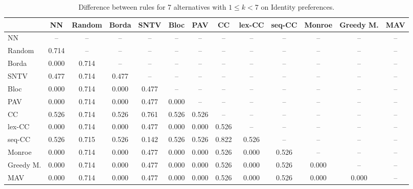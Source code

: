 
\begin{table*}[htbp]
\centering
\begin{tabular}{lcccccccccccc}
\toprule
 & NN & Random & Borda & SNTV & Bloc & PAV & CC & lex-CC & seq-CC & Monroe & Greedy M. & MAV \\
\midrule
NN & -- & -- & -- & -- & -- & -- & -- & -- & -- & -- & -- & -- \\
Random & \cellcolor{blue!71} 0.714 & -- & -- & -- & -- & -- & -- & -- & -- & -- & -- & -- \\
Borda & \cellcolor{blue!0} 0.000 & \cellcolor{blue!71} 0.714 & -- & -- & -- & -- & -- & -- & -- & -- & -- & -- \\
SNTV & \cellcolor{blue!47} 0.477 & \cellcolor{blue!71} 0.714 & \cellcolor{blue!47} 0.477 & -- & -- & -- & -- & -- & -- & -- & -- & -- \\
Bloc & \cellcolor{blue!0} 0.000 & \cellcolor{blue!71} 0.714 & \cellcolor{blue!0} 0.000 & \cellcolor{blue!47} 0.477 & -- & -- & -- & -- & -- & -- & -- & -- \\
PAV & \cellcolor{blue!0} 0.000 & \cellcolor{blue!71} 0.714 & \cellcolor{blue!0} 0.000 & \cellcolor{blue!47} 0.477 & \cellcolor{blue!0} 0.000 & -- & -- & -- & -- & -- & -- & -- \\
CC & \cellcolor{blue!52} 0.526 & \cellcolor{blue!71} 0.714 & \cellcolor{blue!52} 0.526 & \cellcolor{blue!76} 0.761 & \cellcolor{blue!52} 0.526 & \cellcolor{blue!52} 0.526 & -- & -- & -- & -- & -- & -- \\
lex-CC & \cellcolor{blue!0} 0.000 & \cellcolor{blue!71} 0.714 & \cellcolor{blue!0} 0.000 & \cellcolor{blue!47} 0.477 & \cellcolor{blue!0} 0.000 & \cellcolor{blue!0} 0.000 & \cellcolor{blue!52} 0.526 & -- & -- & -- & -- & -- \\
seq-CC & \cellcolor{blue!52} 0.526 & \cellcolor{blue!71} 0.715 & \cellcolor{blue!52} 0.526 & \cellcolor{blue!14} 0.142 & \cellcolor{blue!52} 0.526 & \cellcolor{blue!52} 0.526 & \cellcolor{blue!82} 0.822 & \cellcolor{blue!52} 0.526 & -- & -- & -- & -- \\
Monroe & \cellcolor{blue!0} 0.000 & \cellcolor{blue!71} 0.714 & \cellcolor{blue!0} 0.000 & \cellcolor{blue!47} 0.477 & \cellcolor{blue!0} 0.000 & \cellcolor{blue!0} 0.000 & \cellcolor{blue!52} 0.526 & \cellcolor{blue!0} 0.000 & \cellcolor{blue!52} 0.526 & -- & -- & -- \\
Greedy M. & \cellcolor{blue!0} 0.000 & \cellcolor{blue!71} 0.714 & \cellcolor{blue!0} 0.000 & \cellcolor{blue!47} 0.477 & \cellcolor{blue!0} 0.000 & \cellcolor{blue!0} 0.000 & \cellcolor{blue!52} 0.526 & \cellcolor{blue!0} 0.000 & \cellcolor{blue!52} 0.526 & \cellcolor{blue!0} 0.000 & -- & -- \\
MAV & \cellcolor{blue!0} 0.000 & \cellcolor{blue!71} 0.714 & \cellcolor{blue!0} 0.000 & \cellcolor{blue!47} 0.477 & \cellcolor{blue!0} 0.000 & \cellcolor{blue!0} 0.000 & \cellcolor{blue!52} 0.526 & \cellcolor{blue!0} 0.000 & \cellcolor{blue!52} 0.526 & \cellcolor{blue!0} 0.000 & \cellcolor{blue!0} 0.000 & -- \\
\bottomrule
\end{tabular}

\caption{Difference between rules for 7 alternatives with $1 \leq k < 7$ on Identity preferences.}
\label{tab:rule_distance_heatmap-m=[7]-pref_dist=identity}
\end{table*}
    